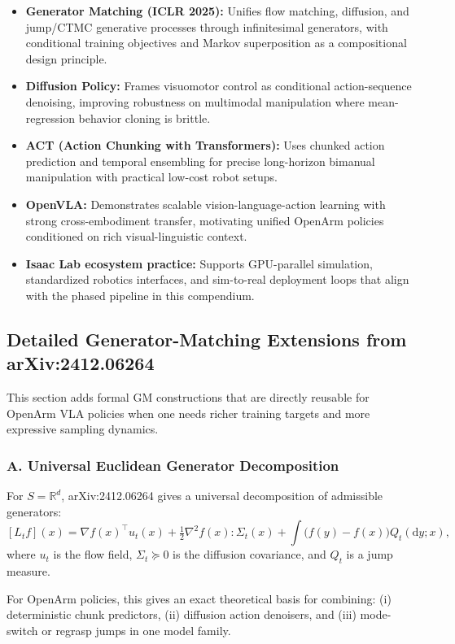 \documentclass[
]{article}
\theoremstyle{remark}
\begin{document}
\begin{itemize}
  \item \textbf{Generator Matching (ICLR 2025):} Unifies flow matching, diffusion, and jump/CTMC generative processes through infinitesimal generators, with conditional training objectives and Markov superposition as a compositional design principle.
  \item \textbf{Diffusion Policy:} Frames visuomotor control as conditional action-sequence denoising, improving robustness on multimodal manipulation where mean-regression behavior cloning is brittle.
  \item \textbf{ACT (Action Chunking with Transformers):} Uses chunked action prediction and temporal ensembling for precise long-horizon bimanual manipulation with practical low-cost robot setups.
  \item \textbf{OpenVLA:} Demonstrates scalable vision-language-action learning with strong cross-embodiment transfer, motivating unified OpenArm policies conditioned on rich visual-linguistic context.
  \item \textbf{Isaac Lab ecosystem practice:} Supports GPU-parallel simulation, standardized robotics interfaces, and sim-to-real deployment loops that align with the phased pipeline in this compendium.
\end{itemize}

\subsection{Detailed Generator-Matching Extensions from arXiv:2412.06264}

This section adds formal GM constructions that are directly reusable for OpenArm VLA policies when one needs richer training targets and more expressive sampling dynamics. \cite{gm2025}

\subsubsection{A. Universal Euclidean Generator Decomposition}

For \(S=\mathbb{R}^d\), arXiv:2412.06264 gives a universal decomposition of admissible generators:
\[
[L_t f](x)
= \nabla f(x)^\top u_t(x)
+ \tfrac12 \nabla^2 f(x) : \Sigma_t(x)
+ \int \bigl(f(y)-f(x)\bigr)Q_t(\mathrm{d}y;x),
\]
where \(u_t\) is the flow field, \(\Sigma_t \succeq 0\) is the diffusion covariance, and \(Q_t\) is a jump measure. \cite{gm2025}

For OpenArm policies, this gives an exact theoretical basis for combining: (i) deterministic chunk predictors, (ii) diffusion action denoisers, and (iii) mode-switch or regrasp jumps in one model family.
\end{document}
